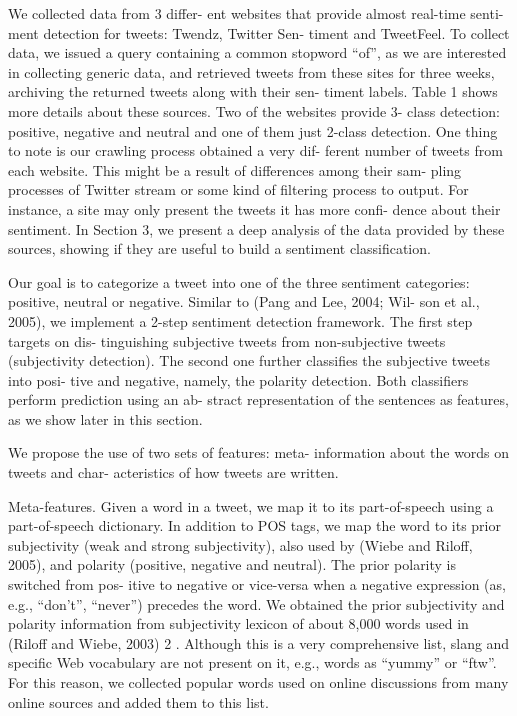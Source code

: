 We collected data from 3 differ- ent websites that provide almost
real-time senti- ment detection for tweets: Twendz, Twitter Sen-
timent and TweetFeel. To collect data, we issued a query containing a
common stopword ``of'', as we are interested in collecting generic
data, and retrieved tweets from these sites for three weeks, archiving
the returned tweets along with their sen- timent labels. Table 1 shows
more details about these sources. Two of the websites provide 3- class
detection: positive, negative and neutral and one of them just 2-class
detection. One thing to note is our crawling process obtained a very
dif- ferent number of tweets from each website. This might be a result
of differences among their sam- pling processes of Twitter stream or
some kind of filtering process to output. For instance, a site may
only present the tweets it has more confi- dence about their
sentiment. In Section 3, we present a deep analysis of the data
provided by these sources, showing if they are useful to build a
sentiment classification.

Our goal is to categorize a tweet into one of the three sentiment
categories: positive, neutral or negative. Similar to (Pang and Lee,
2004; Wil- son et al., 2005), we implement a 2-step sentiment
detection framework. The first step targets on dis- tinguishing
subjective tweets from non-subjective tweets (subjectivity
detection). The second one further classifies the subjective tweets
into posi- tive and negative, namely, the polarity detection.  Both
classifiers perform prediction using an ab- stract representation of
the sentences as features, as we show later in this section.

We propose the use of two sets of features: meta- information about
the words on tweets and char- acteristics of how tweets are written.

Meta-features. Given a word in a tweet, we map it to its
part-of-speech using a part-of-speech dictionary.  In addition to POS
tags, we map the word to its prior subjectivity (weak and strong
subjectivity), also used by (Wiebe and Riloff, 2005), and polarity
(positive, negative and neutral). The prior polarity is switched from
pos- itive to negative or vice-versa when a negative expression (as,
e.g., ``don't'', ``never'') precedes the word.  We obtained the prior
subjectivity and polarity information from subjectivity lexicon of
about 8,000 words used in (Riloff and Wiebe, 2003) 2 . Although this
is a very comprehensive list, slang and specific Web vocabulary are
not present on it, e.g., words as ``yummy'' or ``ftw''.  For this
reason, we collected popular words used on online discussions from
many online sources and added them to this list.

